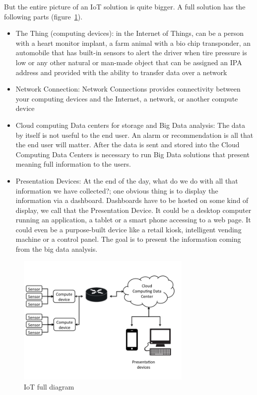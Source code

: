 But the entire picture of an IoT solution is quite bigger. A full solution has 
the following parts (figure~\ref{fig:1.1}).

\begin{itemize} 

\item The Thing (computing devices):  in the Internet of
Things, can be a person with a heart monitor implant, a farm animal with a bio
chip transponder, an automobile that has built-in sensors to alert the driver
when tire pressure is low or any other natural or man-made object that can be
assigned an IPA address and provided with the ability to transfer data over a
network 

\item Network Connection: Network Connections provides connectivity
between your computing devices  and the Internet, a network, or another compute
device 

\item Cloud computing Data centers for storage and Big Data analysis: The data
by itself is not useful to the end user. An alarm or recommendation is all that
the end user will matter. After the data is sent and stored into the Cloud
Computing Data Centers is necessary to run Big Data solutions that present
meaning full information to the users.  

\item Presentation Devices: At the end of the day, what do we do with all that
information we have collected?; one obvious thing is to display the information
via a dashboard. Dashboards have to be hosted on some kind of display, we call
that the Presentation Device.  It could be a desktop computer running an 
application, a tablet or a smart phone accessing to a web page. It could
even be a purpose-built device like a retail kiosk, intelligent vending machine
or a control panel. The goal is to present the information coming from the big
data analysis.

\end{itemize}

\begin{figure}[H]
\centering
\includegraphics[width=0.75\textwidth]{images/IoT_diagram.jpg}
\caption{IoT full diagram }
\label{fig:1.1}
\end{figure}

